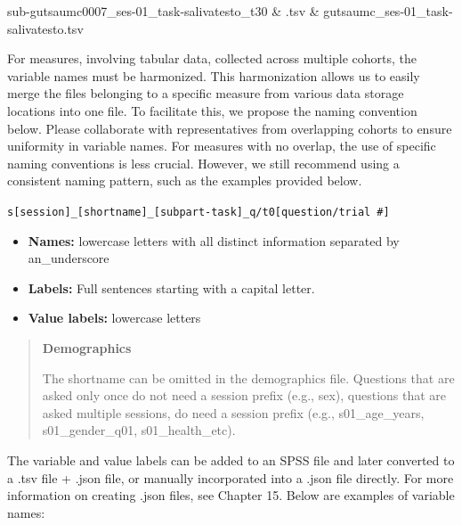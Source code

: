 \documentclass[
  letterpaper,
  DIV=11,
  numbers=noendperiod]{scrreprt}
\begin{document}
\begin{tcolorbox}
\begin{longtable}[]
sub-gutsaumc0007\_ses-01\_task-salivatesto\_t30 & .tsv &
gutsaumc\_ses-01\_task-salivatesto.tsv \\
\end{longtable}

\end{tcolorbox}

\begin{tcolorbox}[enhanced jigsaw, arc=.35mm, left=2mm, colbacktitle=quarto-callout-tip-color!10!white, bottomtitle=1mm, toptitle=1mm, titlerule=0mm, leftrule=.75mm, breakable, colframe=quarto-callout-tip-color-frame, colback=white, opacitybacktitle=0.6, coltitle=black, opacityback=0, rightrule=.15mm, toprule=.15mm, bottomrule=.15mm, title={Variables}]

For measures, involving tabular data, collected across multiple cohorts,
the variable names must be harmonized. This harmonization allows us to
easily merge the files belonging to a specific measure from various data
storage locations into one file. To facilitate this, we propose the
naming convention below. Please collaborate with representatives from
overlapping cohorts to ensure uniformity in variable names. For measures
with no overlap, the use of specific naming conventions is less crucial.
However, we still recommend using a consistent naming pattern, such as
the examples provided below.

\texttt{s{[}session{]}\_{[}shortname{]}\_{[}subpart-task{]}\_q/t0{[}question/trial\ \#{]}}

\begin{itemize}
\item
  \textbf{Names:} lowercase letters with all distinct information
  separated by an\_underscore
\item
  \textbf{Labels:} Full sentences starting with a capital letter.
\item
  \textbf{Value labels:} lowercase letters
\end{itemize}

\begin{quote}
\textbf{Demographics}

The shortname can be omitted in the demographics file. Questions that
are asked only once do not need a session prefix (e.g., sex), questions
that are asked multiple sessions, do need a session prefix (e.g.,
s01\_age\_years, s01\_gender\_q01, s01\_health\_etc).
\end{quote}

The variable and value labels can be added to an SPSS file and later
converted to a .tsv file + .json file, or manually incorporated into a
.json file directly. For more information on creating .json files, see
Chapter 15. Below are examples of variable names:


\end{tcolorbox}
\end{document}
